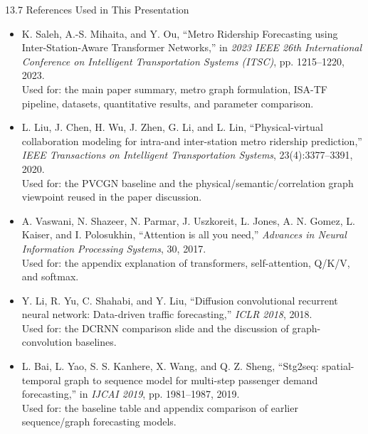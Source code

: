 \documentclass[aspectratio=169]{beamer}
\begin{document}
\begin{frame}{13.7 References Used in This Presentation}
  \tiny
  \begin{itemize}
    \setlength{\itemsep}{0.45em}
    \item K. Saleh, A.-S. Mihaita, and Y. Ou, ``Metro Ridership Forecasting using Inter-Station-Aware Transformer Networks,'' in \textit{2023 IEEE 26th International Conference on Intelligent Transportation Systems (ITSC)}, pp. 1215--1220, 2023.\\
    \textcolor{textInk!70}{Used for: the main paper summary, metro graph formulation, ISA-TF pipeline, datasets, quantitative results, and parameter comparison.}

    \item L. Liu, J. Chen, H. Wu, J. Zhen, G. Li, and L. Lin, ``Physical-virtual collaboration modeling for intra-and inter-station metro ridership prediction,'' \textit{IEEE Transactions on Intelligent Transportation Systems}, 23(4):3377--3391, 2020.\\
    \textcolor{textInk!70}{Used for: the PVCGN baseline and the physical/semantic/correlation graph viewpoint reused in the paper discussion.}

    \item A. Vaswani, N. Shazeer, N. Parmar, J. Uszkoreit, L. Jones, A. N. Gomez, L. Kaiser, and I. Polosukhin, ``Attention is all you need,'' \textit{Advances in Neural Information Processing Systems}, 30, 2017.\\
    \textcolor{textInk!70}{Used for: the appendix explanation of transformers, self-attention, Q/K/V, and softmax.}

    \item Y. Li, R. Yu, C. Shahabi, and Y. Liu, ``Diffusion convolutional recurrent neural network: Data-driven traffic forecasting,'' \textit{ICLR 2018}, 2018.\\
    \textcolor{textInk!70}{Used for: the DCRNN comparison slide and the discussion of graph-convolution baselines.}

    \item L. Bai, L. Yao, S. S. Kanhere, X. Wang, and Q. Z. Sheng, ``Stg2seq: spatial-temporal graph to sequence model for multi-step passenger demand forecasting,'' in \textit{IJCAI 2019}, pp. 1981--1987, 2019.\\
    \textcolor{textInk!70}{Used for: the baseline table and appendix comparison of earlier sequence/graph forecasting models.}
  \end{itemize}
\end{frame}
\end{document}
